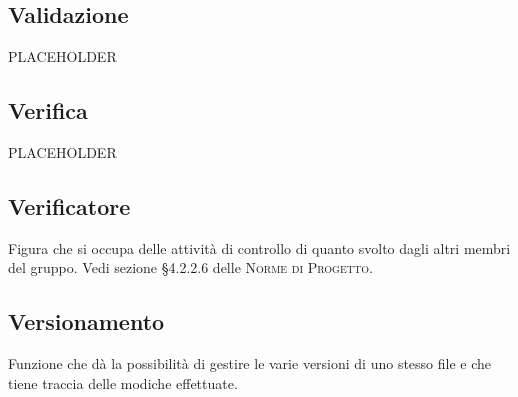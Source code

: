 \documentclass[../glossario.tex]{subfiles}
\begin{document}
\subsection*{Validazione}
PLACEHOLDER

\subsection*{Verifica}
PLACEHOLDER

\subsection*{Verificatore} 
Figura che si occupa delle attività di controllo di quanto svolto dagli altri membri del gruppo. Vedi sezione \S4.2.2.6 delle \textsc{Norme di Progetto}.

\subsection*{Versionamento} 
Funzione che dà la possibilità di gestire le varie versioni di uno stesso file e che tiene traccia delle modiche effettuate.
\end{document}
